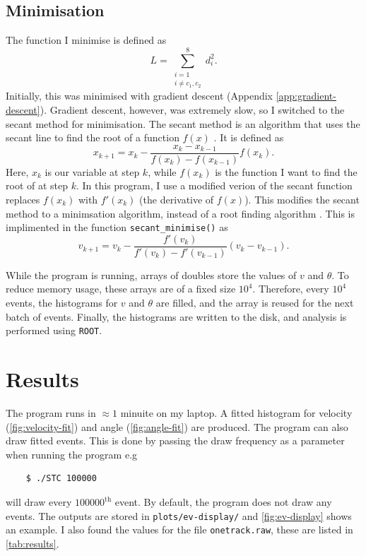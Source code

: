 \documentclass[11pt]{article}
\begin{document}
\subsection{Minimisation}
\label{sec:minimisation}
The function I minimise is defined as
\begin{equation}
    L = \sum\limits_{\substack{i=1 \\ i\neq c_1, c_2}}^{8} d_i^2.
    \label{eq:loss}
\end{equation}
Initially, this was minimised with gradient descent (Appendix \ref{app:gradient-descent}). Gradient descent, however, was extremely slow, so I switched to the secant method for minimisation. The secant method is an algorithm that uses the secant line to find the root of a function $f(x)$ \cite{secant-history}. It is defined as 
\begin{equation}
    x_{k+1} = x_k - \frac{x_k - x_{k-1}}{f(x_k)-f(x_{k-1})} f(x_k).
    \label{eq:secant}
\end{equation}
Here, $x_k$ is our variable at step $k$, while $f(x_k)$ is the function I want to find the root of at step $k$. In this program, I use a modified verion of the secant function replaces $f(x_k)$ with $f'(x_k)$ (the derivative of $f(x)$). This modifies the secant method to a minimsation algorithm, instead of a root finding algorithm \cite{secant-minimsation}. This is implimented in the function \texttt{secant\_minimise()} as
\begin{equation}
    v_{k+1} = v_k - \frac{f'(v_k)}{f'(v_k) - f'(v_{k-1})}(v_k - v_{k-1}).
\end{equation}

While the program is running, arrays of doubles store the values of $v$ and $\theta$. To reduce memory usage, these arrays are of a fixed size $10^4$. Therefore, every $10^4$ events, the histograms for $v$ and $\theta$ are filled, and the array is reused for the next batch of events. Finally, the histograms are written to the disk, and analysis is performed using \texttt{ROOT}.

\section{Results}
\label{sec:results}
The program runs in $\approx 1$ minuite on my laptop. A fitted histogram for velocity (\autoref{fig:velocity-fit}) and angle (\autoref{fig:angle-fit}) are produced. The program can also draw fitted events. This is done by passing the draw frequency as a parameter when running the program e.g
\begin{verbatim}
    $ ./STC 100000
\end{verbatim}
will draw every $100000^\text{th}$ event. By default, the program does not draw any events. The outputs are stored in \texttt{plots/ev-display/} and \autoref{fig:ev-display} shows an example. I also found the values for the file \texttt{onetrack.raw}, these are listed in \autoref{tab:results}.
\end{document}
